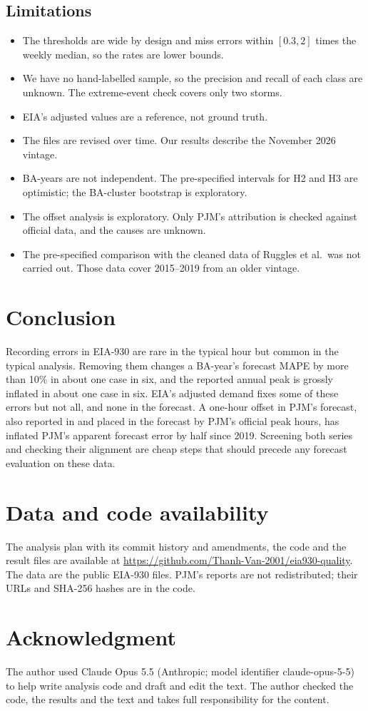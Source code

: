 \documentclass[conference,a4paper]{IEEEtran}
\newcommand{\repoURL}{https://github.com/Thanh-Van-2001/eia930-quality}
\begin{document}
\subsection*{Limitations}
\begin{itemize}
\item The thresholds are wide by design and miss errors within $[0.3, 2]$ times the weekly median, so the rates are lower bounds.
\item We have no hand-labelled sample, so the precision and recall of each class are unknown. The extreme-event check covers only two storms.
\item EIA's adjusted values are a reference, not ground truth.
\item The files are revised over time. Our results describe the November 2026 vintage.
\item BA-years are not independent. The pre-specified intervals for H2 and H3 are optimistic; the BA-cluster bootstrap is exploratory.
\item The offset analysis is exploratory. Only PJM's attribution is checked against official data, and the causes are unknown.
\item The pre-specified comparison with the cleaned data of Ruggles et al.\ was not carried out. Those data cover 2015--2019 from an older vintage.
\end{itemize}

\section{Conclusion}
Recording errors in EIA-930 are rare in the typical hour but common in the typical analysis. Removing them changes a BA-year's forecast MAPE by more than 10\% in about one case in six, and the reported annual peak is grossly inflated in about one case in six. EIA's adjusted demand fixes some of these errors but not all, and none in the forecast. A one-hour offset in PJM's forecast, also reported in \cite{guerrafilho2026scorecard} and placed in the forecast by PJM's official peak hours, has inflated PJM's apparent forecast error by half since 2019. Screening both series and checking their alignment are cheap steps that should precede any forecast evaluation on these data.

\section*{Data and code availability}
The analysis plan with its commit history and amendments, the code and the result files are available at \url{\repoURL}. The data are the public EIA-930 files. PJM's reports are not redistributed; their URLs and SHA-256 hashes are in the code.

\section*{Acknowledgment}
The author used Claude Opus 5.5 (Anthropic; model identifier claude-opus-5-5) to help write analysis code and draft and edit the text. The author checked the code, the results and the text and takes full responsibility for the content.



\end{document}
